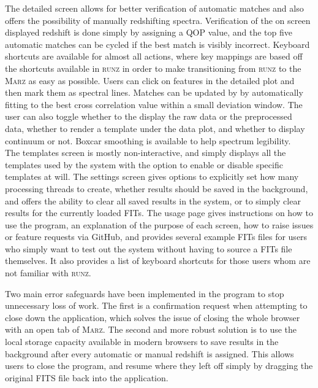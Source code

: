 \documentclass[iop]{emulateapj}
\newcommand{\runz}{\textsc{runz}}
\newcommand{\marz}{\textsc{Marz}}
\begin{document}
The detailed screen allows for better verification of automatic matches and also offers the possibility of manually redshifting spectra. Verification of the on screen displayed redshift is done simply by assigning a QOP value, and the top five automatic matches can be cycled if the best match is visibly incorrect. Keyboard shortcuts are available for almost all actions, where key mappings are based off the shortcuts available in \runz{} in order to make transitioning from \runz{} to the \marz{} as easy as possible. Users can click on features in the detailed plot and then mark them as spectral lines. Matches can be updated by by automatically fitting to the best cross correlation value within a small deviation window. The user can also toggle whether to the display the raw data or the preprocessed data, whether to render a template under the data plot, and whether to display continuum or not. Boxcar smoothing is available to help spectrum legibility.\\

The templates screen is mostly non-interactive, and simply displays all the templates used by the system with the option to enable or disable specific templates at will. The settings screen gives options to explicitly set how many processing threads to create, whether results should be saved in the background, and offers the ability to clear all saved results in the system, or to simply clear results for the currently loaded FITs. The usage page gives instructions on how to use the program, an explanation of the purpose of each screen, how to raise issues or feature requests via GitHub, and provides several example FITs files for users who simply want to test out the system without having to source a FITs file themselves. It also provides a list of keyboard shortcuts for those users whom are not familiar with \runz{}.

Two main error safeguards have been implemented in the program to stop unnecessary loss of work. The first is a confirmation request when attempting to close down the application, which solves the issue of closing the whole browser with an open tab of \marz{}. The second and more robust solution is to use the local storage capacity available in modern browsers to save results in the background after every automatic or manual redshift is assigned. This allows users to close the program, and resume where they left off simply by dragging the original FITS file back into the application.
\end{document}
